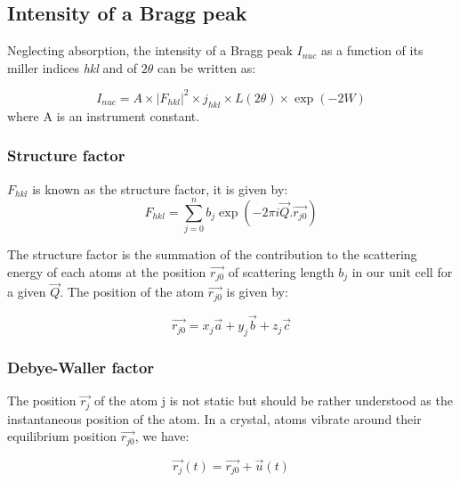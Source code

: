 \subsection{Intensity of a Bragg peak}
Neglecting absorption, the intensity of a Bragg peak $I_{nuc}$ as a function of its miller indices \textit{hkl} and of $2\theta$ can be written as:

\begin{equation}
    \label{eq:PeakIntensity}
    I_{nuc} = A \times |F_{hkl}|^2  \times j_{hkl} \times L(2\theta) \times \exp{(-2W)}
\end{equation}
where A is an instrument constant.

\subsubsection{Structure factor}
$F_{hkl}$ is known as the structure factor, it is given by:
\begin{equation}
    \label{eq:StrucFactor}
    F_{hkl} = \sum_{j=0}^n b_j \exp{(-2\pi i \vec{Q}. \vec{r_{j0}})}
\end{equation}{}

The structure factor is the summation of the contribution to the scattering energy of each atoms at the position $\vec{r_{j0}}$ of scattering length $b_j$ in our unit cell for a given $\vec{Q}$.
The position of the atom $\vec{r_{j0}}$ is given by:

\begin{equation}
    \label{eq:AtomPos}
    \vec{r_{j0}} = x_j\vec{a} + y_j\vec{b} + z_j\vec{c}
\end{equation}

\subsubsection{Debye-Waller factor}

The position $\vec{r_j}$ of the atom j is not static but should be rather understood as the instantaneous position of the atom. In a crystal, atoms vibrate around their equilibrium position $\vec{r_{j0}}$, we have:

\begin{equation}
    \vec{r_j}(t)=\vec{r_{j0}} + \vec{u}(t)
\end{equation}{}


